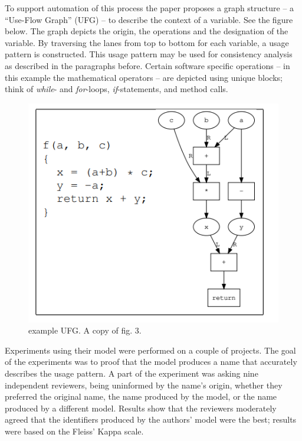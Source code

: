 \documentclass[a4paper,12pt]{article}
\begin{document}
\begin{multicols}{2}
    To support automation of this process the paper proposes a graph structure -- a “Use-Flow Graph” (UFG) -- to
    describe
    the context of a variable. See the figure below. The graph depicts the origin, the operations and the designation
    of
    the variable. By traversing the lanes from top to bottom for each variable, a usage pattern is constructed. This
    usage
    pattern  may be used for consistency analysis as described in the paragraphs before. Certain software specific
    operations -- in this example the mathematical operators -- are depicted using unique blocks; think of
    \textit{while}-
    and \textit{for}-loops, \textit{if}-statements, and method calls.

    \begin{figure}[H]
        \centering
        \includegraphics[width=1.0\linewidth]{ufg}
        \caption{example UFG. A copy of fig. 3.\cite{shinyama_improving_2021}}
        \label{fig:ufg}
    \end{figure}
    \hfill

    Experiments using their model were performed on a couple of projects. The goal of the experiments was to proof that
    the
    model produces a name that accurately describes the usage pattern. A part of the experiment was asking nine
    independent
    reviewers, being uninformed by the name's origin, whether they preferred the original name, the name produced by
    the
    model, or the name produced by a different model. Results show that the reviewers moderately agreed that the
    identifiers produced by the authors' model were the best; results were based on the Fleiss' Kappa scale.


\end{multicols}
\end{document}

